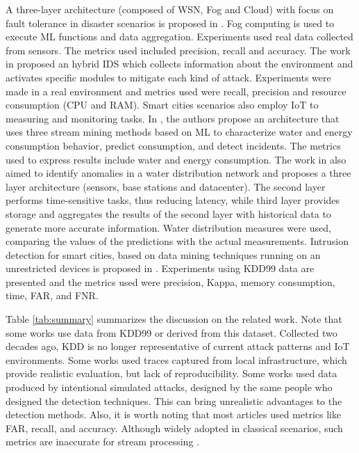 A three-layer architecture (composed of WSN, Fog and Cloud) with focus on fault
tolerance in disaster scenarios is proposed in \cite{Fault-tolerance-disaster}.
Fog computing is used to execute ML functions and data aggregation. Experiments
used real data collected from sensors. The metrics used included precision,
recall and accuracy.
%
The work in \cite{Kalis} proposed an hybrid IDS which collects information about
the environment and activates specific modules to mitigate each kind of attack.
Experiments were made in a real environment and metrics used were recall,
precision and resource consumption (CPU and RAM).
%
Smart cities scenarios also employ IoT to measuring and monitoring tasks.
In \cite{IoT-arch-smartmeter}, the authors propose an architecture that uses
three stream mining methods based on ML to characterize water and energy
consumption behavior, predict consumption, and detect incidents.
The metrics used to express results include water and energy consumption.
%
The work in \cite{scalable-anomaly-detection-smart-city} also aimed to identify
anomalies in a water distribution network and proposes a three layer
architecture (sensors, base stations and datacenter).
The second layer performs time-sensitive tasks, thus reducing latency, while
third layer provides storage and aggregates the results of the second layer with
historical data to generate more accurate information.
Water distribution measures were used, comparing the values of the predictions
with the actual measurements.
%
Intrusion detection for smart cities, based on data mining techniques running on
an unrestricted devices is proposed in \cite{DS-based-IDS-SmartGrid}.
Experiments using KDD99 data are presented and the metrics used were precision,
Kappa, memory consumption, time, FAR, and FNR.


Table \ref{tab:summary} summarizes the discussion on the related work.
Note that some works use data from KDD99 or derived from this dataset.
Collected two decades ago, KDD is no longer representative of current attack
patterns and IoT environments.
Some works used traces captured from local infrastructure, which provide
realistic evaluation, but lack of reproducibility.
Some works used data produced by intentional simulated attacks, designed by the
same people who designed the detection techniques.
This can bring unrealistic advantages to the detection methods.
Also, it is worth noting that most articles used metrics like FAR, recall, and
accuracy.
Although widely adopted in classical scenarios, such metrics are inaccurate for
stream processing \cite{GAMA2010}.

